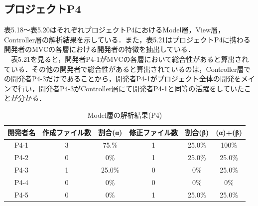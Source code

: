 \documentclass{funthesis}
\begin{document}
\subsection{プロジェクトP4}
表5.18〜表5.20はそれぞれプロジェクトP4におけるModel層，View層，Controller層の解析結果を示している．また，表5.21はプロジェクトP4に携わる開発者のMVCの各層における開発者の特徴を抽出している．
\\　表5.21を見ると，開発者P4-1がMVCの各層において総合性があると算出されている．その他の開発者で総合性があると算出されているのは，Controller層での開発者P4-3だけであることから，開発者P4-1がプロジェクト全体の開発をメインで行い，開発者P4-3がController層にて開発者P4-1と同等の活躍をしていたことが分かる．
\begin{table}[H]
  \begin{center}
\begin{tabular}{|c|c|c|c|c||c|}\hline
開発者名&作成ファイル数&割合(α)&修正ファイル数&割合(β)&(α)+(β)\\ \hline
P4-1 & 3 & 75.\% & 1 & 25.0\% & 100\%\\ \hline \hline
P4-2 & 0 & 0\% & 1 & 25.0\% & 25.0\%\\ \hline \hline
P4-3 & 1 & 25.0\% & 0 & 0\% & 25.0\%\\ \hline \hline
P4-4 & 0 & 0\% & 0 & 0\% & 0\%\\ \hline \hline
P4-5 & 0 & 0\% & 1 & 25.0\% & 25.0\%\\ \hline 
\end{tabular}    
\caption{Model層の解析結果(P4)}    \label{sample}
  \end{center}
\end{table}
\end{document}
